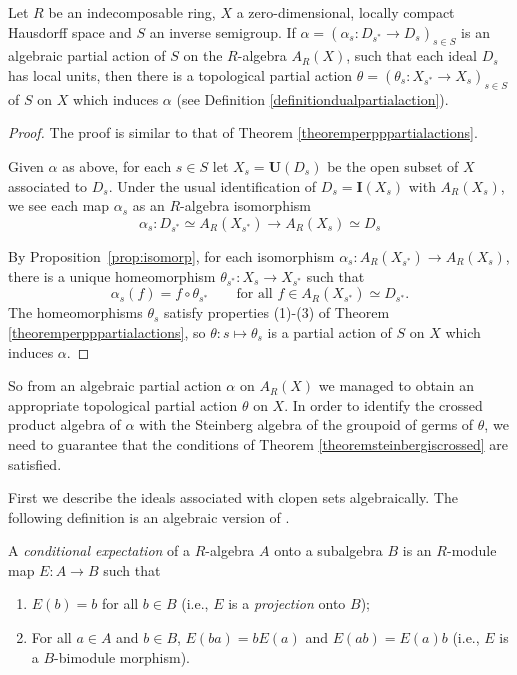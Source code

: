 \begin{proposition}\label{prop:actionalphatheta}
Let $R$ be an indecomposable ring, $X$ a zero-dimensional, locally compact Hausdorff space and $S$ an inverse semigroup. If $\alpha=\left(\alpha_s:D_{s^*}\to D_s\right)_{s\in S}$ is an algebraic partial action of $S$ on the $R$-algebra $A_R(X)$, such that each ideal $D_s$ has local units, then there is a topological partial action $\theta=\left(\theta_s:X_{s^*}\to X_s\right)_{s\in S}$ of $S$ on $X$ which induces $\alpha$ (see Definition \ref{definitiondualpartialaction}).
\end{proposition}
\begin{proof}
The proof is similar to that of Theorem \ref{theoremperpppartialactions}.

Given $\alpha$ as above, for each $s\in S$ let $X_s=\mathbf{U}(D_s)$ be the open subset of $X$ associated to $D_s$. Under the usual identification of $D_s= \mathbf{I}(X_s)$ with $A_R(X_s)$, we see each map $\alpha_s$ as an $R$-algebra isomorphism
\[\alpha_s:D_{s^*}\simeq A_R(X_{s^*})\to A_R(X_s)\simeq D_s\]

By Proposition~\ref{prop:isomorp}, for each isomorphism $\alpha_s:A_R(X_{s^*})\to A_R(X_s)$, there is a unique homeomorphism $\theta_{s^*}: X_s \rightarrow X_{s^*}$ such that 
\[\alpha_s(f)=f\circ\theta_{s^*}\qquad\text{for all }f\in A_R(X_{s^*})\simeq D_{s^*}.\]
The homeomorphisms $\theta_s$ satisfy properties (1)-(3) of Theorem \ref{theoremperpppartialactions}, so $\theta:s\mapsto \theta_s$ is a partial action of $S$ on $X$ which induces $\alpha$.\qedhere
\end{proof}

So from an algebraic partial action $\alpha$ on $A_R(X)$ we managed to obtain an appropriate topological partial action $\theta$ on $X$. In order to identify the crossed product algebra of $\alpha$ with the Steinberg algebra of the groupoid of germs of $\theta$, we need to guarantee that the conditions of Theorem \ref{theoremsteinbergiscrossed} are satisfied.

First we describe the ideals associated with clopen sets algebraically. The following definition is an algebraic version of \cite[Definition 1.5.9]{MR2391387}.

\begin{definition}
A \emph{conditional expectation} of a $R$-algebra $A$ onto a subalgebra $B$ is an $R$-module map $E:A\to B$ such that
\begin{enumerate}
\item[(i)] $E(b)=b$ for all $b\in B$ (i.e., $E$ is a \emph{projection} onto $B$);
\item[(ii)] For all $a\in A$ and $b\in B$, $E(ba)=bE(a)$ and $E(ab)=E(a)b$ (i.e., $E$ is a $B$-bimodule morphism).
\end{enumerate}
\end{definition}

